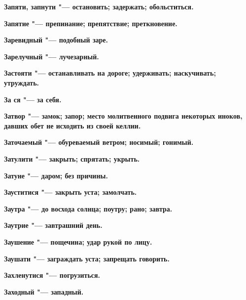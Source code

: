 \begin{mymulticols}{2}
\bfseries Запяти, запнути\normalfont{} "--- остановить; задержать; обольститься. 




\bfseries Запятие\normalfont{} "--- препинание; препятствие; преткновение. 




\bfseries Заревидный\normalfont{} "--- подобный заре. 




\bfseries Зарелучный\normalfont{} "--- лучезарный. 




\bfseries Застояти\normalfont{} "--- останавливать на дороге; удерживать; наскучивать; утруждать. 




\bfseries За ся\normalfont{} "--- за себя. 




\bfseries Затвор\normalfont{} "--- замок; запор; место молитвенного подвига некоторых иноков, давших обет не исходить из своей келлии. 




\bfseries Заточаемый\normalfont{} "--- обуреваемый ветром; носимый; гонимый. 




\bfseries Затулити\normalfont{} "--- закрыть; спрятать; укрыть. 




\bfseries Затуне\normalfont{} "--- даром; без причины. 




\bfseries Зауститися\normalfont{} "--- закрыть уста; замолчать. 




\bfseries Заутра\normalfont{} "--- до восхода солнца; поутру; рано; завтра. 




\bfseries Заутрие\normalfont{} "--- завтрашний день. 




\bfseries Заушение\normalfont{} "--- пощечина; удар рукой по лицу. 




\bfseries Заушати\normalfont{} "--- заграждать уста; запрещать говорить. 




\bfseries Захленутися\normalfont{} "--- погрузиться. 




\bfseries Заходный\normalfont{} "--- западный. 





\end{mymulticols}

